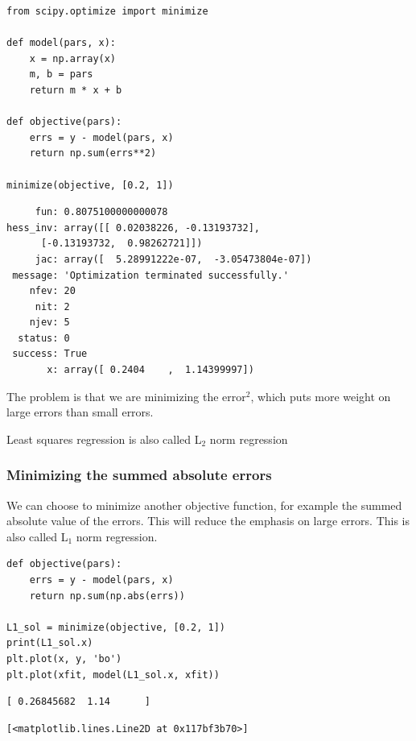 \documentclass[11pt]{article}
\begin{document}
\begin{verbatim}
from scipy.optimize import minimize

def model(pars, x):
    x = np.array(x)
    m, b = pars
    return m * x + b

def objective(pars):
    errs = y - model(pars, x)
    return np.sum(errs**2)

minimize(objective, [0.2, 1])
\end{verbatim}

\begin{verbatim}
     fun: 0.8075100000000078
hess_inv: array([[ 0.02038226, -0.13193732],
      [-0.13193732,  0.98262721]])
     jac: array([  5.28991222e-07,  -3.05473804e-07])
 message: 'Optimization terminated successfully.'
    nfev: 20
     nit: 2
    njev: 5
  status: 0
 success: True
       x: array([ 0.2404    ,  1.14399997])
\end{verbatim}

The problem is that we are minimizing the error\(^{\text{2}}\), which puts more weight on large errors than small errors.

Least squares regression is also called L\(_{\text{2}}\) norm regression

\subsubsection{Minimizing the summed absolute errors}
\label{sec:org6c4e45e}

We can choose to minimize another objective function, for example the summed absolute value of the errors. This will reduce the emphasis on large errors. This is  also called L\(_{\text{1}}\) norm regression.

\begin{verbatim}
def objective(pars):
    errs = y - model(pars, x)
    return np.sum(np.abs(errs))

L1_sol = minimize(objective, [0.2, 1])
print(L1_sol.x)
plt.plot(x, y, 'bo')
plt.plot(xfit, model(L1_sol.x, xfit))
\end{verbatim}

\begin{verbatim}
[ 0.26845682  1.14      ]

\end{verbatim}

\begin{verbatim}
[<matplotlib.lines.Line2D at 0x117bf3b70>]
\end{verbatim}
\end{document}
